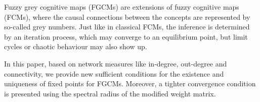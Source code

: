 
Fuzzy grey cognitive maps (FGCMs) are extensions of fuzzy cognitive maps (FCMs), where the causal connections between the concepts are represented by so-called grey numbers.  Just like in classical FCMs, the inference is determined by an iteration process, which may converge to an equilibrium point, but limit cycles or chaotic behaviour may also show up.

In this paper, based on network measures like in-degree, out-degree and connectivity, we provide new sufficient conditions for the existence and uniqueness of fixed points for FGCMs. Moreover, a tighter convergence condition is presented using the spectral radius of the modified weight matrix.


